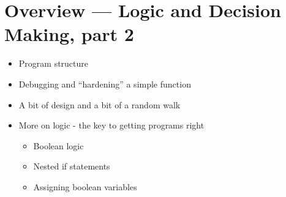\documentclass[letterpaper,10pt,english]{sphinxmanual}
\begin{document}
\section{Overview — Logic and Decision Making, part 2}
\label{\detokenize{lecture_notes/lec11_conditionals2:overview-logic-and-decision-making-part-2}}\begin{itemize}
\item {} 
Program structure

\item {} 
Debugging and “hardening” a simple function

\item {} 
A bit of design and a bit of a random walk

\item {} 
More on logic - the key to getting programs right
\begin{itemize}
\item {} 
Boolean logic

\item {} 
Nested if statements

\item {} 
Assigning boolean variables

\end{itemize}

\end{itemize}
\end{document}

